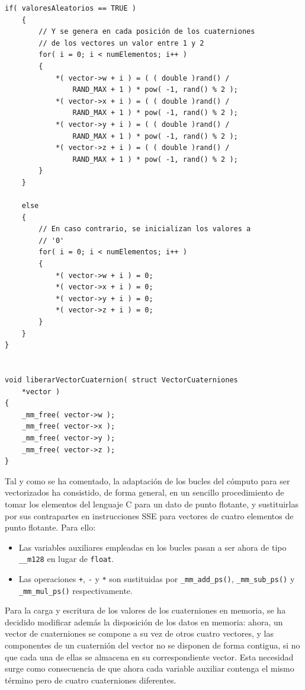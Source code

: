 \documentclass[conference]{IEEEtran}
\begin{document}
\begin{lstlisting}[style=CStyle, title=Código con la ejecución del bucle vectorizada.]
    if( valoresAleatorios == TRUE )
    {
        // Y se genera en cada posición de los cuaterniones
        // de los vectores un valor entre 1 y 2
        for( i = 0; i < numElementos; i++ )
        {
            *( vector->w + i ) = ( ( double )rand() /
                RAND_MAX + 1 ) * pow( -1, rand() % 2 );
            *( vector->x + i ) = ( ( double )rand() /
                RAND_MAX + 1 ) * pow( -1, rand() % 2 );
            *( vector->y + i ) = ( ( double )rand() /
                RAND_MAX + 1 ) * pow( -1, rand() % 2 );
            *( vector->z + i ) = ( ( double )rand() /
                RAND_MAX + 1 ) * pow( -1, rand() % 2 );
        }
    }

    else
    {
        // En caso contrario, se inicializan los valores a 
        // '0'
        for( i = 0; i < numElementos; i++ )
        {
            *( vector->w + i ) = 0;
            *( vector->x + i ) = 0;
            *( vector->y + i ) = 0;
            *( vector->z + i ) = 0;
        }
    }
}


void liberarVectorCuaternion( struct VectorCuaterniones
    *vector )
{
    _mm_free( vector->w );
    _mm_free( vector->x );
    _mm_free( vector->y );
    _mm_free( vector->z );
}
\end{lstlisting}

Tal y como se ha comentado, la adaptación de los bucles del cómputo para ser vectorizados ha consistido, de forma general, en un sencillo procedimiento de tomar los elementos del lenguaje C para un dato de punto flotante, y sustituirlas por sus contrapartes en instrucciones SSE para vectores de cuatro elementos de punto flotante. Para ello:
\begin{itemize}
    \item Las variables auxiliares empleadas en los bucles pasan a ser ahora de tipo \texttt{\_\_m128} en lugar de \texttt{float}.
    \item Las operaciones \texttt{+}, \texttt{-} y \texttt{*} son sustituidas por \texttt{\_mm\_add\_ps()}, \texttt{\_mm\_sub\_ps()} y \texttt{\_mm\_mul\_ps()} respectivamente.
\end{itemize}

Para la carga y escritura de los valores de los cuaterniones en memoria, se ha decidido modificar además la disposición de los datos en memoria: ahora, un vector de cuaterniones se compone a su vez de otros cuatro vectores, y las componentes de un cuaternión del vector no se disponen de forma contigua, si no que cada una de ellas se almacena en su correspondiente vector. Esta necesidad surge como consecuencia de que ahora cada variable auxiliar contenga el mismo término pero de cuatro cuaterniones diferentes.
\end{document}
